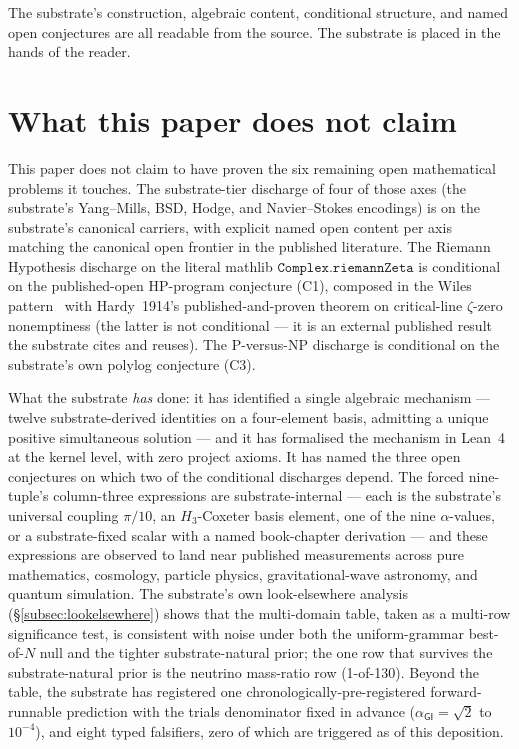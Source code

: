 \documentclass[11pt,a4paper]{amsart}
\theoremstyle{plain}
\theoremstyle{definition}
\begin{document}
The substrate's construction, algebraic content, conditional structure, and named open conjectures are all readable from the source. The substrate is placed in the hands of the reader.

\section{What this paper does not claim}

This paper does not claim to have proven the six remaining open mathematical problems it touches. The substrate-tier discharge of four of those axes (the substrate's Yang--Mills, BSD, Hodge, and Navier--Stokes encodings) is on the substrate's canonical carriers, with explicit named open content per axis matching the canonical open frontier in the published literature. The Riemann Hypothesis discharge on the literal mathlib $\texttt{Complex.riemannZeta}$ is conditional on the published-open HP-program conjecture (C1), composed in the Wiles pattern~\cite{wiles1995} with Hardy~1914's published-and-proven theorem on critical-line $\zeta$-zero nonemptiness (the latter is not conditional --- it is an external published result the substrate cites and reuses). The P-versus-NP discharge is conditional on the substrate's own polylog conjecture (C3).

What the substrate \emph{has} done: it has identified a single algebraic mechanism --- twelve substrate-derived identities on a four-element basis, admitting a unique positive simultaneous solution --- and it has formalised the mechanism in Lean~4 at the kernel level, with zero project axioms. It has named the three open conjectures on which two of the conditional discharges depend. The forced nine-tuple's column-three expressions are substrate-internal --- each is the substrate's universal coupling $\pi/10$, an $H_3$-Coxeter basis element, one of the nine $\alpha$-values, or a substrate-fixed scalar with a named book-chapter derivation --- and these expressions are observed to land near published measurements across pure mathematics, cosmology, particle physics, gravitational-wave astronomy, and quantum simulation. The substrate's own look-elsewhere analysis (\S\ref{subsec:lookelsewhere}) shows that the multi-domain table, taken as a multi-row significance test, is consistent with noise under both the uniform-grammar best-of-$N$ null and the tighter substrate-natural prior; the one row that survives the substrate-natural prior is the neutrino mass-ratio row (1-of-130). Beyond the table, the substrate has registered one chronologically-pre-registered forward-runnable prediction with the trials denominator fixed in advance ($\alpha_{\textsf{GI}} = \sqrt{2}$ to $10^{-4}$), and eight typed falsifiers, zero of which are triggered as of this deposition.
\end{document}
